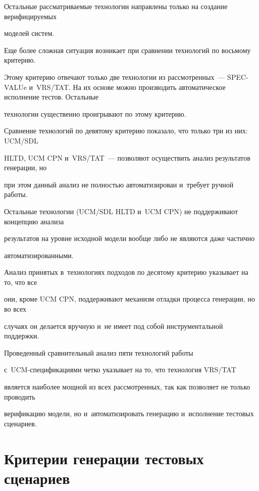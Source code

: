 Остальные рассматриваемые технологии направлены только на создание верифицируемых

моделей систем.



  Еще более сложная ситуация возникает при сравнении технологий по восьмому критерию.

Этому критерию отвечают только две технологии из рассмотренных~--- SPEC-VALUe и~VRS/TAT. На их основе можно производить автоматическое исполнение тестов. Остальные

технологии существенно проигрывают по этому критерию.



  Сравнение технологий по девятому критерию показало, что только три из них: UCM/SDL

HLTD, UCM CPN и~VRS/TAT~--- позволяют осуществить анализ результатов генерации, но

при этом данный анализ не полностью автоматизирован и~требует ручной работы.

Остальные технологии (UCM/SDL HLTD и~UCM CPN) не поддерживают концепцию анализа

результатов на уровне исходной модели вообще либо не являются даже частично

автоматизированными.



  Анализ принятых в~технологиях подходов по десятому критерию указывает на то, что все

они, кроме UCM CPN, поддерживают механизм отладки процесса генерации, но во всех

случаях он делается вручную и~не имеет под собой инструментальной поддержки.



  Проведенный сравнительный анализ пяти технологий работы

  с~UCM-спе\-ци\-фи\-ка\-ци\-я\-ми четко указывает на то, что технология VRS/TAT

является наиболее мощной из всех рассмотренных, так как позволяет не только проводить

верификацию модели, но и~автоматизировать генерацию и~исполнение тестовых сценариев.



\vspace*{-3pt}



\section{Критерии генерации тестовых сценариев}



